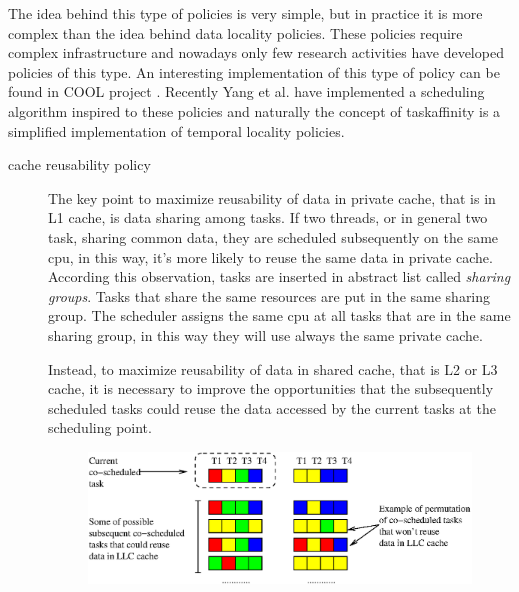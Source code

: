 The idea behind this type of policies is very simple, but in practice it is more complex than the idea behind data locality policies. These policies 
require complex infrastructure and nowadays only few research activities have developed policies of this type. An interesting implementation of this type 
of policy can be found in COOL project \cite{COOL}. Recently Yang et al. \cite{taiwan} have implemented a scheduling algorithm inspired to these policies 
and naturally the concept of taskaffinity is a simplified implementation of temporal locality policies.

\begin{description}
\item[cache reusability policy]
The key point to maximize reusability of data in private cache, that is in L1 cache, is data sharing among tasks. If two threads, or in general two task, 
sharing common data, they are scheduled subsequently on the same cpu, in this way, it's more likely to reuse the same data in private cache.
According this observation, tasks are inserted in abstract list called \textit{sharing groups}. Tasks that share the same resources are put in the 
same sharing group. The scheduler assigns the same cpu at all tasks that are in the same sharing group, in this way they will use always the same private 
cache. 

Instead, to maximize reusability of data in shared cache, that is L2 or L3 cache, it is necessary to improve the opportunities that the subsequently 
scheduled tasks could reuse the data accessed by the current tasks at the scheduling point.

\begin{figure}[htbp]
\centering
\includegraphics[width=\widefigure]{images/cosched_permut.eps}
\caption{}
\label{fig:cosched_permutation}
\end{figure}


\end{description}
